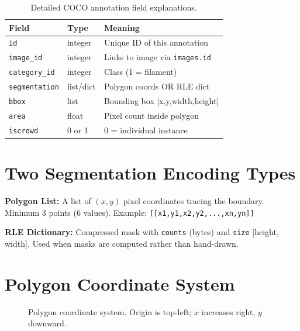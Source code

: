 \documentclass[12pt,a4paper,openany]{report}
\begin{document}
\begin{table}[H]
\centering
\caption{Detailed COCO annotation field explanations.}
\renewcommand{\arraystretch}{1.3}
\begin{tabular}{l l p{7cm}}
\toprule
\textbf{Field} & \textbf{Type} & \textbf{Meaning} \\
\midrule
\texttt{id}           & integer & Unique ID of this annotation \\
\texttt{image\_id}    & integer & Links to image via \texttt{images.id} \\
\texttt{category\_id} & integer & Class (1 = filament) \\
\texttt{segmentation} & list/dict & Polygon coords OR RLE dict \\
\texttt{bbox}         & list    & Bounding box [x,y,width,height] \\
\texttt{area}         & float   & Pixel count inside polygon \\
\texttt{iscrowd}      & 0 or 1  & 0 = individual instance \\
\bottomrule
\end{tabular}
\label{tab:coco_ann}
\end{table}

\section{Two Segmentation Encoding Types}

\begin{defbox}
\textbf{Polygon List:} A list of $(x,y)$ pixel coordinates tracing the boundary.
Minimum 3 points (6 values). Example: \texttt{[[x1,y1,x2,y2,...,xn,yn]]}

\vspace{4pt}
\textbf{RLE Dictionary:} Compressed mask with \texttt{counts} (bytes) and \texttt{size}
[height, width]. Used when masks are computed rather than hand-drawn.
\end{defbox}

\section{Polygon Coordinate System}

\begin{figure}[H]
\centering
{}
\caption{Polygon coordinate system. Origin is top-left; $x$ increases right, $y$ downward.}
\label{fig:polygon}
\end{figure}
\end{document}
